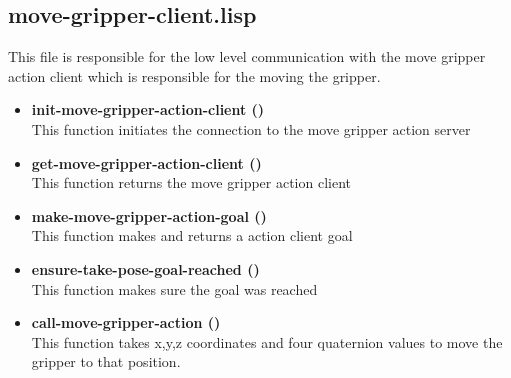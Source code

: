 \documentclass[main.tex]{subfiles}
\begin{document}
		\subsection{move-gripper-client.lisp}
		This file is responsible for the low level communication with the
		move gripper action client which is responsible for the moving the gripper.
		\begin{itemize}
			\item \textbf{init-move-gripper-action-client ()} \\
			This function initiates the connection to the move gripper action server
			\item \textbf{get-move-gripper-action-client ()} \\
			This function returns the move gripper action client
			\item \textbf{make-move-gripper-action-goal ()} \\
			This function makes and returns a action client goal
			\item \textbf{ensure-take-pose-goal-reached ()} \\
            This function makes sure the goal was reached
			\item \textbf{call-move-gripper-action ()} \\
			This function takes x,y,z coordinates and four quaternion values to move the gripper to that position. 
		\end{itemize}
\end{document}
